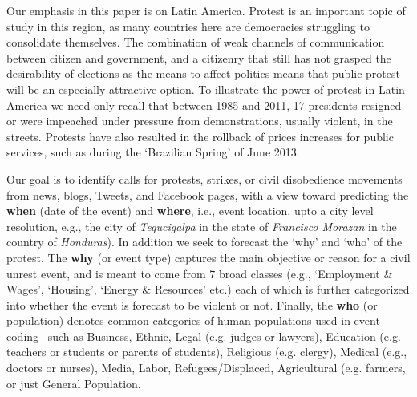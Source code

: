 Our emphasis in this paper is on Latin America.
Protest is an important topic of study in this
region, as many countries here are democracies struggling to consolidate themselves.
The combination of weak channels of communication between citizen and government, and a citizenry that still 
has not grasped the desirability of elections as the means to affect politics means that public protest 
will be an especially attractive option. To illustrate the power of protest in Latin America we need 
only recall that between 1985 and 2011, 17 presidents resigned or were impeached under pressure from 
demonstrations, usually violent, in the streets. Protests have also resulted 
in the rollback of prices increases for public services, such as during the `Brazilian Spring' of June 2013.

Our goal is to identify calls for protests, strikes, or civil disobedience movements from news, blogs, Tweets, and Facebook
pages, with a view toward predicting the {\bf when} (date of the event) and {\bf where}, i.e.,
event location, upto a city level resolution, e.g., 
the city of {\it Tegucigalpa} in the state of {\it Francisco Morazan} in the country of {\it Honduras}).
In addition we seek to forecast the `why' and `who' of the protest.
The {\bf why} (or event type)
captures the main objective or reason for a civil unrest event,
and is meant to come from 7 broad classes (e.g., `Employment \& Wages',
`Housing', `Energy \& Resources' etc.) each of which is further categorized into
whether the event is forecast to be violent or not.
Finally, the {\bf who} (or population)
denotes common categories of human populations
used in event coding~\cite{philschrodt}
such as
Business, Ethnic, Legal (e.g. judges or lawyers), Education (e.g. teachers or students or parents of students), Religious (e.g. clergy), Medical (e.g., doctors or nurses), Media, Labor, Refugees/Displaced, Agricultural (e.g. farmers,
or just General Population. 


